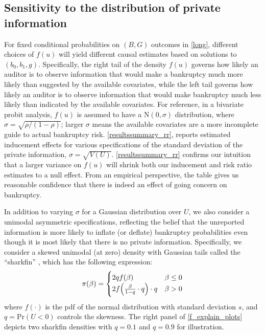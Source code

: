 \documentclass[aoas,preprint, 11pt, dvipsnames, table, x11name]{imsart}
\newcommand{\N}{\mbox{N}}
\theoremstyle{remark}
\begin{document}
	\subsection{Sensitivity to the distribution of private information}\label{sens_analysis}
	
	For fixed conditional probabilities on $(B, G)$ outcomes in \autoref{long}, different choices of $f(u)$ will yield different causal estimates based on solutions to $(b_0, b_1, g)$. Specifically, the right tail of the density $f(u)$ governs how likely an auditor is to observe information that would make a bankruptcy much more likely than suggested by the available covariates, while the left tail governs how likely an auditor is to observe information that would make bankruptcy much less likely than indicated by the available covariates. For reference, in a bivariate probit analysis, $f(u)$ is assumed to have a $\N(0, \sigma)$ distribution, where $\sigma = \sqrt{\rho/(1-\rho)}$; larger $\sigma$ means the available covariates are a more incomplete guide to actual bankruptcy risk. \autoref{resultssummary_rr}, reports estimated inducement effects for various specifications of the standard deviation of the private information, $\sigma = \sqrt{V(U)}$.  \autoref{resultssummary_rr} confirms our intuition that a larger variance on $f(u)$ will shrink both our inducement and risk ratio estimates to a null effect.  From an empirical perspective, the table gives us reasonable confidence that there is indeed an effect of going concern on bankruptcy.  
	\color{black}
	
	In addition to varying $\sigma$ for a Gaussian distribution over $U$, we also consider a unimodal asymmetric specifications, reflecting the belief that the unreported information is more likely to inflate (or deflate) bankruptcy probabilities even though it is most likely that there is no private information. Specifically, we consider a skewed unimodal (at zero) density with Gaussian tails called the ``sharkfin'' \citep{hahnslice}, which has the following expression:
	\begin{equation}
		\pi(\beta)=\begin{cases}
			2qf(\beta)&\beta\leq 0\\
			2f\qty(\frac{\beta}{1-q}\cdot q)\cdot q&\beta>0
		\end{cases}
		\label{shark}
	\end{equation}
	where $f(\cdot)$ is the pdf of the normal distribution with standard deviation $s$, and $q = \mbox{Pr}(U < 0)$ controls the skewness. The right panel of \autoref{f_explain_plots} depicts two sharkfin densities with $q = 0.1$ and $q = 0.9$ for illustration.
	
\end{document}
